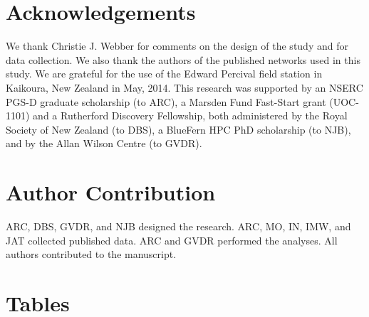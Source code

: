 \documentclass[12pt]{article}
\begin{document}
\begin{spacing}{1.5}

\section*{Acknowledgements}
  
  We thank Christie J. Webber for comments on the design of the 
  study and for data collection. 
  We also thank the authors of the published networks used in this study. 
  We are grateful for the use of the Edward Percival field station in Kaikoura, 
  New Zealand in May, 2014. This research was supported by an NSERC PGS-D 
  graduate scholarship (to ARC), a Marsden Fund Fast-Start grant (UOC-1101) and a 
  Rutherford Discovery Fellowship, both administered by the Royal Society of New 
  Zealand (to DBS), a BlueFern HPC PhD scholarship (to NJB), and by
  the Allan Wilson Centre (to GVDR).


\section*{Author Contribution}

  ARC, DBS, GVDR, and NJB designed the research. ARC, MO, IN, IMW, and JAT collected published data. 
  ARC and GVDR performed the analyses. All authors contributed to the manuscript.

\end{spacing}

\newpage

\renewcommand*{\bibfont}{\raggedright}



\newpage
\section*{Tables}
\end{document}
